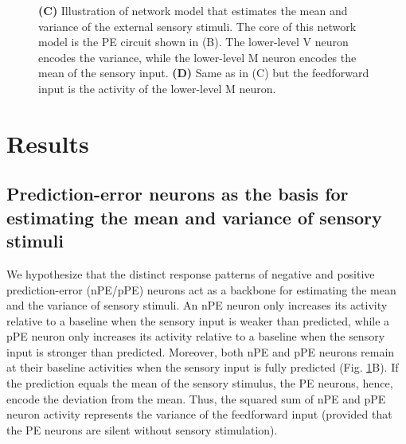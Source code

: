 \documentclass[10pt,a4paper]{article}
\begin{document}
\begin{figure}[t!]
{{\bf (C)} Illustration of network model that estimates the mean and variance of the external sensory stimuli. The core of this network model is the PE circuit shown in (B). The lower-level V neuron encodes the variance, while the lower-level M neuron encodes the mean of the sensory input.
{\bf (D)} Same as in (C) but the feedforward input is the activity of the lower-level M neuron.
}
\label{fig:Fig_1}
\end{figure}
%


\section*{Results}
%

\subsection*{Prediction-error neurons as the basis for estimating the mean and variance of sensory stimuli}
%
We hypothesize that the distinct response patterns of negative and positive prediction-error (nPE/pPE) neurons act as a backbone for estimating the mean and the variance of sensory stimuli. An nPE neuron only increases its activity relative to a baseline when the sensory input is weaker than predicted, while a pPE neuron only increases its activity relative to a baseline when the sensory input is stronger than predicted. Moreover, both nPE and pPE neurons remain at their baseline activities when the sensory input is fully predicted (Fig. \ref{fig:Fig_1}B). If the prediction equals the mean of the sensory stimulus, the PE neurons, hence, encode the deviation from the mean. Thus, the squared sum of nPE and pPE neuron activity represents the variance of the feedforward input (provided that the PE neurons are silent without sensory stimulation).
%
\end{document}
